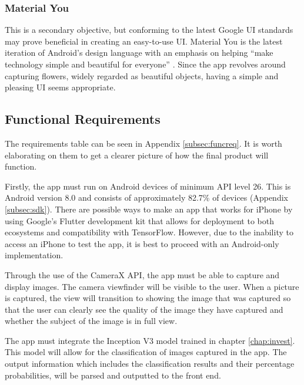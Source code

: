 \documentclass[12pt,a4paper]{report}
\begin{document}
\subsubsection{Material You}

This is a secondary objective, but conforming to the latest Google UI standards may prove beneficial in creating 
an easy-to-use UI. Material You is the latest iteration of Android's design language with an emphasis on helping “make 
technology simple and beautiful for everyone” \citep{material}. Since the app revolves around capturing flowers, widely 
regarded as beautiful objects, having a simple and pleasing UI seems appropriate. 

\subsection{Functional Requirements}

The requirements table can be seen in Appendix \ref{subsec:funcreq}. It is worth elaborating on them to get a clearer 
picture of how the final product will function. 

\par

Firstly, the app must run on Android devices of minimum API level 26. This is Android version 8.0 and 
consists of approximately 82.7\% of devices (Appendix \ref{subsec:sdk}). 
There are possible ways to make an app that works for iPhone by using Google's Flutter development kit that allows 
for deployment to both ecosystems and compatibility with TensorFlow. However, due to the inability to access an iPhone 
to test the app, it is best to proceed with an Android-only implementation.

\par

Through the use of the CameraX API, the app must be able to capture and display images. The camera viewfinder will be 
visible to the user. When a picture is captured, the view will transition to showing the image that was captured so 
that the user can clearly see the quality of the image they have captured and whether the subject of the image is in 
full view.

\par

The app must integrate the Inception V3 model trained in chapter \ref{chap:invest}. 
This model will allow for the classification of 
images captured in the app. The output information which includes the classification results and their percentage 
probabilities, will be parsed and outputted to the front end.
\end{document}
